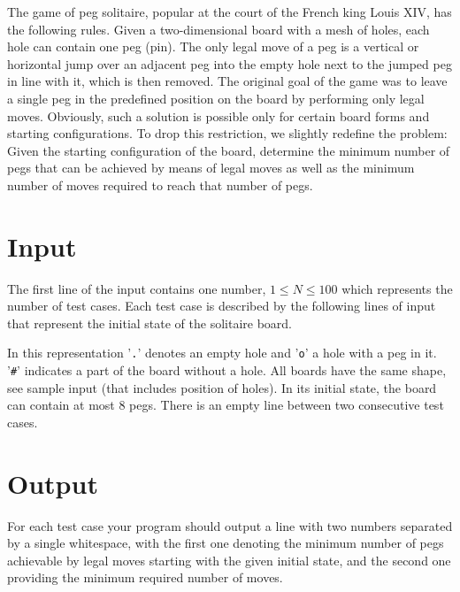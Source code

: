 
The game of peg solitaire, popular at the court of the French king Louis XIV, has
the following rules. Given a two-dimensional board with a mesh of holes, each
hole can contain one peg (pin). The only legal move of a peg is a vertical or
horizontal jump over an adjacent peg into the empty hole next to the jumped peg in line with it,
which is then removed. The original goal of
the game was to leave a single peg in the predefined position on the board by
performing only legal moves. Obviously, such a solution is possible only for certain
board forms and starting configurations. To drop this restriction, we slightly redefine the
problem: Given the starting configuration of the board, determine the
minimum number of pegs that can be achieved by means of legal moves as well as
the minimum number of moves required to reach that number of pegs.

\section*{Input}
The first line of the input contains one number, $1\leq N\leq100$ which represents
the number of test cases. Each test case is described by the following lines of input
that represent the initial state of the solitaire board.

In this representation '{\tt .}' denotes an empty hole
and '{\tt o}' a hole with a peg in it. '{\tt \#}' indicates a part of the board
without a hole. All boards have the same shape, see sample input (that includes position of holes). In its
initial state, the board can contain at most $8$ pegs.
There is an empty line between two consecutive test cases.

\section*{Output}
For each test case your program should output a line with two numbers separated
by a single whitespace, with the first one denoting the minimum number of pegs achievable
by legal moves starting with the given initial state, and the second
one providing the minimum required number of moves.
